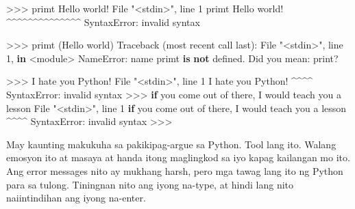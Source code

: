 \documentclass[10pt,]{book}
\newenvironment{Shaded}{}{}
\newcommand{\ControlFlowTok}[1]{\textcolor[rgb]{0.00,0.44,0.13}{\textbf{#1}}}
\newcommand{\DecValTok}[1]{\textcolor[rgb]{0.25,0.63,0.44}{#1}}
\newcommand{\KeywordTok}[1]{\textcolor[rgb]{0.00,0.44,0.13}{\textbf{#1}}}
\newcommand{\NormalTok}[1]{#1}
\newcommand{\OperatorTok}[1]{\textcolor[rgb]{0.40,0.40,0.40}{#1}}
\newcommand{\PreprocessorTok}[1]{\textcolor[rgb]{0.74,0.48,0.00}{#1}}
\newcommand{\StringTok}[1]{\textcolor[rgb]{0.25,0.44,0.63}{#1}}
\begin{document}
\begin{Shaded}
\begin{Highlighting}[]
\OperatorTok{\textgreater{}\textgreater{}\textgreater{}}\NormalTok{ primt }\StringTok{\textquotesingle{}Hello world!\textquotesingle{}}
\NormalTok{File }\StringTok{"\textless{}stdin\textgreater{}"}\NormalTok{, line }\DecValTok{1}
\NormalTok{    primt }\StringTok{\textquotesingle{}Hello world!\textquotesingle{}}
          \OperatorTok{\^{}\^{}\^{}\^{}\^{}\^{}\^{}\^{}\^{}\^{}\^{}\^{}\^{}\^{}}
\PreprocessorTok{SyntaxError}\NormalTok{: invalid syntax}

\OperatorTok{\textgreater{}\textgreater{}\textgreater{}}\NormalTok{ primt (}\StringTok{\textquotesingle{}Hello world\textquotesingle{}}\NormalTok{)}
\NormalTok{Traceback (most recent call last):}
\NormalTok{  File }\StringTok{"\textless{}stdin\textgreater{}"}\NormalTok{, line }\DecValTok{1}\NormalTok{, }\KeywordTok{in} \OperatorTok{\textless{}}\NormalTok{module}\OperatorTok{\textgreater{}}
\PreprocessorTok{NameError}\NormalTok{: name }\StringTok{\textquotesingle{}primt\textquotesingle{}} \KeywordTok{is} \KeywordTok{not}\NormalTok{ defined. Did you mean: }\StringTok{\textquotesingle{}print\textquotesingle{}}\NormalTok{?}

\OperatorTok{\textgreater{}\textgreater{}\textgreater{}}\NormalTok{ I hate you Python}\OperatorTok{!}
\NormalTok{File }\StringTok{"\textless{}stdin\textgreater{}"}\NormalTok{, line }\DecValTok{1}
\NormalTok{    I hate you Python}\OperatorTok{!}
      \OperatorTok{\^{}\^{}\^{}\^{}}
\PreprocessorTok{SyntaxError}\NormalTok{: invalid syntax}
\OperatorTok{\textgreater{}\textgreater{}\textgreater{}} \ControlFlowTok{if}\NormalTok{ you come out of there, I would teach you a lesson}
\NormalTok{File }\StringTok{"\textless{}stdin\textgreater{}"}\NormalTok{, line }\DecValTok{1}
    \ControlFlowTok{if}\NormalTok{ you come out of there, I would teach you a lesson}
           \OperatorTok{\^{}\^{}\^{}\^{}}
\PreprocessorTok{SyntaxError}\NormalTok{: invalid syntax}
\OperatorTok{\textgreater{}\textgreater{}\textgreater{}}
\end{Highlighting}
\end{Shaded}

May kaunting makukuha sa pakikipag-argue sa Python. Tool lang ito.
Walang emosyon ito at masaya at handa itong maglingkod sa iyo kapag
kailangan mo ito. Ang error messages nito ay mukhang harsh, pero mga
tawag lang ito ng Python para sa tulong. Tiningnan nito ang iyong
na-type, at hindi lang nito naiintindihan ang iyong na-enter.
\end{document}
